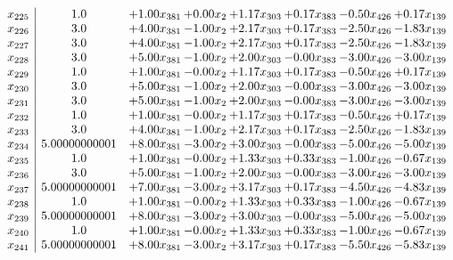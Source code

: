 \documentclass[8pt]{article}
\begin{document}
\[\begin{array}{c| c c@{\hskip 2pt} c@{\hskip 2pt} c@{\hskip 2pt} c@{\hskip 2pt} c@{\hskip 2pt} c@{\hskip 2pt} }
 x_{225}   &  1.0 & +  1.00 x_{381} & +  0.00 x_{2} & +  1.17 x_{303} & +  0.17 x_{383} & -0.50 x_{426} & +  0.17 x_{139}\\
 x_{226}   &  3.0 & +  4.00 x_{381} & -1.00 x_{2} & +  2.17 x_{303} & +  0.17 x_{383} & -2.50 x_{426} & -1.83 x_{139}\\
 x_{227}   &  3.0 & +  4.00 x_{381} & -1.00 x_{2} & +  2.17 x_{303} & +  0.17 x_{383} & -2.50 x_{426} & -1.83 x_{139}\\
 x_{228}   &  3.0 & +  5.00 x_{381} & -1.00 x_{2} & +  2.00 x_{303} & -0.00 x_{383} & -3.00 x_{426} & -3.00 x_{139}\\
 x_{229}   &  1.0 & +  1.00 x_{381} & -0.00 x_{2} & +  1.17 x_{303} & +  0.17 x_{383} & -0.50 x_{426} & +  0.17 x_{139}\\
 x_{230}   &  3.0 & +  5.00 x_{381} & -1.00 x_{2} & +  2.00 x_{303} & -0.00 x_{383} & -3.00 x_{426} & -3.00 x_{139}\\
 x_{231}   &  3.0 & +  5.00 x_{381} & -1.00 x_{2} & +  2.00 x_{303} & -0.00 x_{383} & -3.00 x_{426} & -3.00 x_{139}\\
 x_{232}   &  1.0 & +  1.00 x_{381} & -0.00 x_{2} & +  1.17 x_{303} & +  0.17 x_{383} & -0.50 x_{426} & +  0.17 x_{139}\\
 x_{233}   &  3.0 & +  4.00 x_{381} & -1.00 x_{2} & +  2.17 x_{303} & +  0.17 x_{383} & -2.50 x_{426} & -1.83 x_{139}\\
 x_{234}   &  5.00000000001 & +  8.00 x_{381} & -3.00 x_{2} & +  3.00 x_{303} & -0.00 x_{383} & -5.00 x_{426} & -5.00 x_{139}\\
 x_{235}   &  1.0 & +  1.00 x_{381} & -0.00 x_{2} & +  1.33 x_{303} & +  0.33 x_{383} & -1.00 x_{426} & -0.67 x_{139}\\
 x_{236}   &  3.0 & +  5.00 x_{381} & -1.00 x_{2} & +  2.00 x_{303} & -0.00 x_{383} & -3.00 x_{426} & -3.00 x_{139}\\
 x_{237}   &  5.00000000001 & +  7.00 x_{381} & -3.00 x_{2} & +  3.17 x_{303} & +  0.17 x_{383} & -4.50 x_{426} & -4.83 x_{139}\\
 x_{238}   &  1.0 & +  1.00 x_{381} & -0.00 x_{2} & +  1.33 x_{303} & +  0.33 x_{383} & -1.00 x_{426} & -0.67 x_{139}\\
 x_{239}   &  5.00000000001 & +  8.00 x_{381} & -3.00 x_{2} & +  3.00 x_{303} & -0.00 x_{383} & -5.00 x_{426} & -5.00 x_{139}\\
 x_{240}   &  1.0 & +  1.00 x_{381} & -0.00 x_{2} & +  1.33 x_{303} & +  0.33 x_{383} & -1.00 x_{426} & -0.67 x_{139}\\
 x_{241}   &  5.00000000001 & +  8.00 x_{381} & -3.00 x_{2} & +  3.17 x_{303} & +  0.17 x_{383} & -5.50 x_{426} & -5.83 x_{139}\\

\end{array}\]
\end{document}
